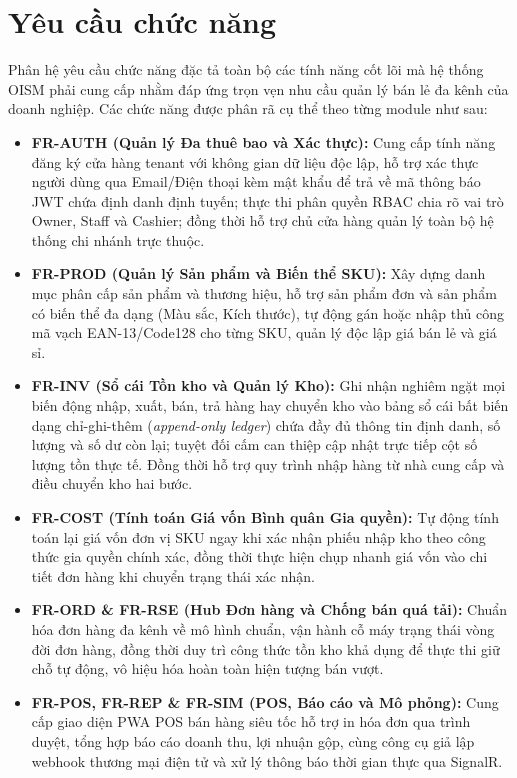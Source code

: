 \documentclass[12pt,a4paper]{report}
\begin{document}
	\section{Yêu cầu chức năng}
	Phân hệ yêu cầu chức năng đặc tả toàn bộ các tính năng cốt lõi mà hệ thống OISM phải cung cấp nhằm đáp ứng trọn vẹn nhu cầu quản lý bán lẻ đa kênh của doanh nghiệp. Các chức năng được phân rã cụ thể theo từng module như sau:
	\begin{itemize}
		\item \textbf{FR-AUTH (Quản lý Đa thuê bao và Xác thực):} Cung cấp tính năng đăng ký cửa hàng tenant với không gian dữ liệu độc lập, hỗ trợ xác thực người dùng qua Email/Điện thoại kèm mật khẩu để trả về mã thông báo JWT chứa định danh định tuyến; thực thi phân quyền RBAC chia rõ vai trò Owner, Staff và Cashier; đồng thời hỗ trợ chủ cửa hàng quản lý toàn bộ hệ thống chi nhánh trực thuộc.
		\item \textbf{FR-PROD (Quản lý Sản phẩm và Biến thể SKU):} Xây dựng danh mục phân cấp sản phẩm và thương hiệu, hỗ trợ sản phẩm đơn và sản phẩm có biến thể đa dạng (Màu sắc, Kích thước), tự động gán hoặc nhập thủ công mã vạch EAN-13/Code128 cho từng SKU, quản lý độc lập giá bán lẻ và giá sỉ.
		\item \textbf{FR-INV (Sổ cái Tồn kho và Quản lý Kho):} Ghi nhận nghiêm ngặt mọi biến động nhập, xuất, bán, trả hàng hay chuyển kho vào bảng sổ cái bất biến dạng chỉ-ghi-thêm (\textit{append-only ledger}) chứa đầy đủ thông tin định danh, số lượng và số dư còn lại; tuyệt đối cấm can thiệp cập nhật trực tiếp cột số lượng tồn thực tế. Đồng thời hỗ trợ quy trình nhập hàng từ nhà cung cấp và điều chuyển kho hai bước.
		\item \textbf{FR-COST (Tính toán Giá vốn Bình quân Gia quyền):} Tự động tính toán lại giá vốn đơn vị SKU ngay khi xác nhận phiếu nhập kho theo công thức gia quyền chính xác, đồng thời thực hiện chụp nhanh giá vốn vào chi tiết đơn hàng khi chuyển trạng thái xác nhận.
		\item \textbf{FR-ORD \& FR-RSE (Hub Đơn hàng và Chống bán quá tải):} Chuẩn hóa đơn hàng đa kênh về mô hình chuẩn, vận hành cỗ máy trạng thái vòng đời đơn hàng, đồng thời duy trì công thức tồn kho khả dụng để thực thi giữ chỗ tự động, vô hiệu hóa hoàn toàn hiện tượng bán vượt.
		\item \textbf{FR-POS, FR-REP \& FR-SIM (POS, Báo cáo và Mô phỏng):} Cung cấp giao diện PWA POS bán hàng siêu tốc hỗ trợ in hóa đơn qua trình duyệt, tổng hợp báo cáo doanh thu, lợi nhuận gộp, cùng công cụ giả lập webhook thương mại điện tử và xử lý thông báo thời gian thực qua SignalR.
	\end{itemize}
	
\end{document}
